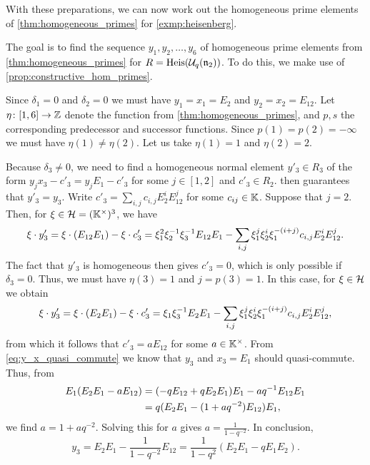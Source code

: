 With these preparations, we can now work out the homogeneous prime elements of \cref{thm:homogeneous_primes} for \cref{exmp:heisenberg}.

\begin{example}
	The goal is to find the sequence $y_1, y_2, \dots, y_6$ of homogeneous prime elements from \cref{thm:homogeneous_primes} for $R = \operatorname{Heis}(\mathcal{U}_q(\mathfrak{n}_2))$. To do this, we make use of \cref{prop:constructive_hom_primes}.

	Since $\delta_1 = 0$ and $\delta_2 = 0$ we must have $y_1 = x_1 = E_2$ and $y_2 = x_2 = E_{12}$. Let $\eta \colon [1, 6] \to \mathbb{Z}$ denote the function from \cref{thm:homogeneous_primes}, and $p,s$ the corresponding predecessor and successor functions. Since $p(1) = p(2) = -\infty$ we must have $\eta(1) \neq \eta(2)$. Let us take $\eta(1) = 1$ and $\eta(2) = 2$.

	Because $\delta_3 \neq 0$, we need to find a homogeneous normal element $y'_3 \in R_3$ of the form $y_j x_3 - c'_3 = y_j E_1 - c'_3$ for some $j \in [1,2]$ and $c'_3 \in R_{2}$.  then guarantees that $y'_3 = y_3$. Write $c'_3 = \sum_{i,j} c_{i,j} E_2^i E_{12}^j$ for some $c_{ij} \in \mathbb{K}$. Suppose that $j = 2$. Then, for $\xi \in \mathcal{H} = (\mathbb{K}^\times)^3$, we have
	\begin{equation*}
		\xi \cdot y'_3 = \xi \cdot (E_{12} E_1) - \xi \cdot c'_3 = \xi_1^2\xi_2^{-1} \xi_3^{-1} E_{12} E_1 - \sum_{i,j} \xi_1^j\xi_2^i \xi_1^{-(i+j)}c_{i,j}E_2^i E_{12}^j.
	\end{equation*}
	The fact that $y'_3$ is homogeneous then gives $c'_3 = 0$, which is only possible if $\delta_3 = 0$. Thus, we must have  $\eta(3) = 1$ and $j = p(3) = 1$. In this case, for $\xi \in \mathcal{H}$ we obtain
	\begin{equation*}
		\xi \cdot y'_3 = \xi \cdot (E_{2} E_1) - \xi \cdot c'_3 = \xi_1 \xi_3^{-1} E_2 E_1- \sum_{i,j} \xi_1^j\xi_2^i \xi_1^{-(i+j)}c_{i,j}E_2^i E_{12}^j,
	\end{equation*}
	from which it follows that $c'_3 = a E_{12}$ for some $a \in \mathbb{K}^\times$. From \cref{eq:y_x_quasi_commute} we know that $y_3$ and $x_3 = E_1$ should quasi-commute. Thus, from
	\begin{align*}
		E_1 (E_2 E_1 - a E_{12})
		&= (-q E_{12} + q E_2 E_1)E_1 - a q^{-1}  E_{12} E_1 \\
		&= q( E_2 E_1 -(1 +  a q^{-2})  E_{12}) E_1,
	\end{align*}
	we find $a = 1 + aq^{-2}$. Solving this for $a$ gives $a = \frac{1}{1-q^{-2}}$. In conclusion,
	\begin{equation*}
		y_3 = E_2 E_1 - \frac{1}{1-q^{-2}}E_{12} = \frac{1}{1-q^2}(E_2 E_1 - q E_1 E_2).
	\end{equation*}


\end{example}

